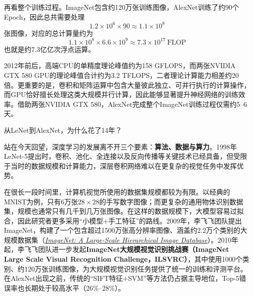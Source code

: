 再看整个训练过程。ImageNet包含约120万张训练图像，AlexNet训练了约90个Epoch，因此总共需要处理
$$
1.2\times10^6\times90\approx1.1\times10^8
$$
张图像，对应的总计算量约为
$$
1.1\times10^8\times6.6\times10^9
\approx7.3\times10^{17}\ \text{FLOP}
$$
也就是约7.3亿亿次浮点运算。

2012年前后，高端CPU的单精度理论峰值约为158 GFLOPS，而两张NVIDIA GTX 580 GPU的理论峰值合计约为3.2 TFLOPS，二者理论计算能力相差约20倍。更重要的是，卷积和矩阵运算中包含大量彼此独立、可并行执行的计算操作，而GPU恰好擅长处理这类大规模并行计算，因此能够显著提升神经网络的训练效率。借助两张NVIDIA GTX 580，AlexNet完成整个ImageNet训练过程仅需约5--6天。

\begin{cyanBox}{从LeNet到AlexNet，为什么花了14年？}

站在今天回望，深度学习的发展离不开三个要素：\textbf{算法、数据与算力}。1998年LeNet-5提出时，卷积、池化、全连接以及反向传播等关键技术已经具备，但受限于当时的数据规模和计算能力，深层卷积网络难以在更复杂的视觉任务中发挥优势。

在很长一段时间里，计算机视觉所使用的数据集规模都较为有限。以经典的MNIST为例，只有6万张$28\times28$的手写数字图像；而更复杂的通用物体识别数据集，规模也通常只有几千到几万张图像。在这样的数据规模下，大模型容易过拟合，因此研究者更多采用“小模型+手工特征”的路线。2009年，李飞飞团队提出ImageNet，构建了一个包含超过1500万张高分辨率图像、涵盖约2.2万个类别的大规模数据集（\href{https://image-net.org/static_files/papers/imagenet_cvpr09.pdf}{\textit{ImageNet: A Large-Scale Hierarchical Image Database}}）。2010年起，李飞飞团队进一步发起\textbf{ImageNet大规模视觉识别挑战赛（ImageNet Large Scale Visual Recognition Challenge，ILSVRC）}，其中使用1000个类别、约120万张训练图像，为大规模视觉识别任务提供了统一的训练和评测平台。在AlexNet出现之前，传统的“SIFT特征+SVM”等方法仍占据主导地位，Top-5错误率也长期处于较高水平（26\%--28\%）。


\end{cyanBox}

